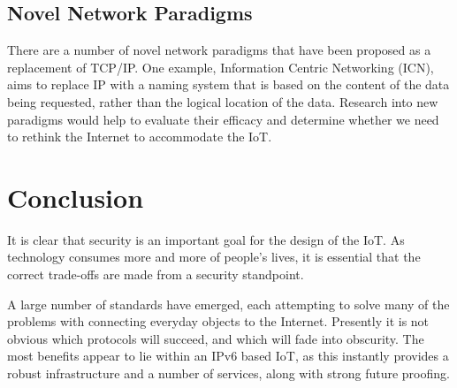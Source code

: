 \documentclass[10pt,journal,compsoc]{IEEEtran}
\begin{document}
\subsection{Novel Network Paradigms}
There are a number of novel network paradigms that have been proposed as a
replacement of TCP/IP. One example, Information Centric Networking (ICN), aims
to replace IP with a naming system that is based on the content of the data
being requested, rather than the logical location of the data. Research into
new paradigms would help to evaluate their efficacy and determine whether we
need to rethink the Internet to accommodate the IoT. 


\section{Conclusion}
It is clear that security is an important goal for the design of the IoT. As
technology consumes more and more of people's lives, it is essential that the
correct trade-offs are made from a security standpoint. 

A large number of standards have emerged, each attempting to solve many of the
problems with connecting everyday objects to the Internet. Presently it is not
obvious which protocols will succeed, and which will fade into obscurity. The
most benefits appear to lie within an IPv6 based IoT, as this instantly
provides a robust infrastructure and a number of services, along with strong
future proofing.  



%
%
%

\sloppy
{}

\end{document}
